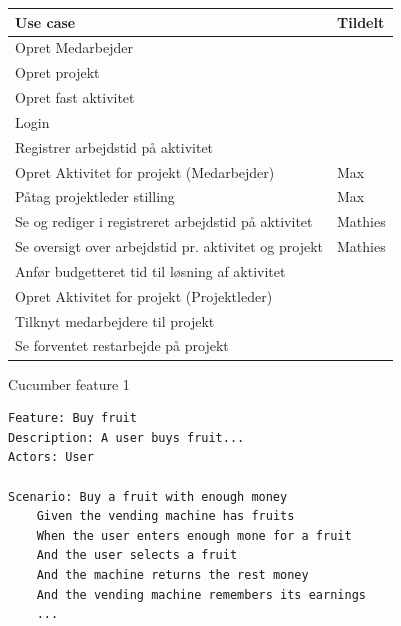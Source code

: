 \begin{table}[H]
    \centering
    \begin{tabular}{ll}
        Use case                                             & Tildelt \\
        \midrule
        Opret Medarbejder                                    & \\
        Opret projekt                                        & \\
        Opret fast aktivitet                                 & \\
        Login                                                & \\
        Registrer arbejdstid på aktivitet                    & \\
        Opret Aktivitet for projekt (Medarbejder)            & Max\\
        Påtag projektleder stilling                          & Max\\
        Se og rediger i registreret arbejdstid på aktivitet  &  Mathies\\
        Se oversigt over arbejdstid pr. aktivitet og projekt & Mathies \\
        Anfør budgetteret tid til løsning af aktivitet       & \\
        Opret Aktivitet for projekt (Projektleder)           & \\
        Tilknyt medarbejdere til projekt                     & \\
        Se forventet restarbejde på projekt                  & \\
    \end{tabular}
\end{table}


\begin{listing}[H]
    \centering
    \caption{Cucumber feature 1}\label{lst:feature1}
    \begin{verbatim}
Feature: Buy fruit
Description: A user buys fruit...
Actors: User

Scenario: Buy a fruit with enough money
    Given the vending machine has fruits
    When the user enters enough mone for a fruit
    And the user selects a fruit
    And the machine returns the rest money
    And the vending machine remembers its earnings
    ...
    \end{verbatim}
\end{listing}